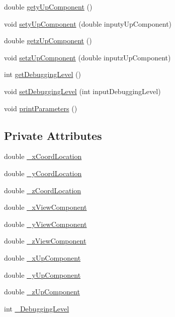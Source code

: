 \begin{DoxyCompactItemize}
\item 
double \hyperlink{classCameraParameters_a126201be23f1fe340d91d9c0400aa752}{gety\-Up\-Component} ()
\item 
void \hyperlink{classCameraParameters_aa9fd97e9d8f5bd5dfdb9ff14df0d5fab}{sety\-Up\-Component} (double inputy\-Up\-Component)
\item 
double \hyperlink{classCameraParameters_a2cac3f45fc2313a4e905f3a055ac8be1}{getz\-Up\-Component} ()
\item 
void \hyperlink{classCameraParameters_a91b8e2e53d2f43dd7c667df0bfef88bd}{setz\-Up\-Component} (double inputz\-Up\-Component)
\item 
int \hyperlink{classCameraParameters_a6534e1c51da94900d75ec010508e7d92}{get\-Debugging\-Level} ()
\item 
void \hyperlink{classCameraParameters_a0d835f8da84cd55181f2fb73b80d65e2}{set\-Debugging\-Level} (int input\-Debugging\-Level)
\item 
void \hyperlink{classCameraParameters_a2655719777072a98d9c5b5fb8351a605}{print\-Parameters} ()
\end{DoxyCompactItemize}
\subsection*{Private Attributes}
\begin{DoxyCompactItemize}
\item 
double \hyperlink{classCameraParameters_a05028ee5801f7b19553188a58c2a83b7}{\-\_\-x\-Coord\-Location}
\item 
double \hyperlink{classCameraParameters_a2c8eed6cd6db7a9b59813787140a3ad4}{\-\_\-y\-Coord\-Location}
\item 
double \hyperlink{classCameraParameters_aed6d05074103cf30bcf3f31815a065ef}{\-\_\-z\-Coord\-Location}
\item 
double \hyperlink{classCameraParameters_a919e9739fbbce30a69214304ecc6fdef}{\-\_\-x\-View\-Component}
\item 
double \hyperlink{classCameraParameters_a49daac0d1aa33ff691ab85b460776376}{\-\_\-y\-View\-Component}
\item 
double \hyperlink{classCameraParameters_ab6f0394f3b83592bdfea515271cf6dcb}{\-\_\-z\-View\-Component}
\item 
double \hyperlink{classCameraParameters_ac5a8e57bc403ae087a6b08a27d0829c0}{\-\_\-x\-Up\-Component}
\item 
double \hyperlink{classCameraParameters_a26e397a27b961d6771ce29c06e6872b7}{\-\_\-y\-Up\-Component}
\item 
double \hyperlink{classCameraParameters_abb271f19440d69874ca9723639dfe96a}{\-\_\-z\-Up\-Component}
\item 
int \hyperlink{classCameraParameters_a420b3f202941492849cd0f32f1f0d060}{\-\_\-\-Debugging\-Level}
\end{DoxyCompactItemize}


